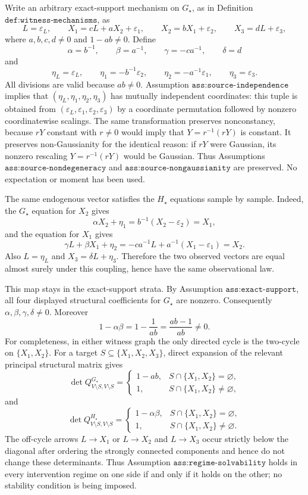 Write an arbitrary exact-support mechanism on \(G_\star\), as in Definition \(\texttt{def:witness-mechanisms}\), as
\[
 L=\varepsilon_L,\qquad
 X_1=cL+aX_2+\varepsilon_1,\qquad
 X_2=bX_1+\varepsilon_2,\qquad
 X_3=dL+\varepsilon_3,
\]
where \(a,b,c,d\ne0\) and \(1-ab\ne0\). Define
\[
 \alpha=b^{-1},\qquad \beta=a^{-1},\qquad
 \gamma=-ca^{-1},\qquad \delta=d
\]
and
\[
 \eta_L=\varepsilon_L,\qquad
 \eta_1=-b^{-1}\varepsilon_2,\qquad
 \eta_2=-a^{-1}\varepsilon_1,\qquad
 \eta_3=\varepsilon_3.
\]
All divisions are valid because \(ab\ne0\). Assumption \(\texttt{ass:source-independence}\) implies that \((\eta_L,\eta_1,\eta_2,\eta_3)\) has mutually independent coordinates: this tuple is obtained from \((\varepsilon_L,\varepsilon_1,\varepsilon_2,\varepsilon_3)\) by a coordinate permutation followed by nonzero coordinatewise scalings. The same transformation preserves nonconstancy, because \(rY\) constant with \(r\ne0\) would imply that \(Y=r^{-1}(rY)\) is constant. It preserves non-Gaussianity for the identical reason: if \(rY\) were Gaussian, its nonzero rescaling \(Y=r^{-1}(rY)\) would be Gaussian. Thus Assumptions \(\texttt{ass:source-nondegeneracy}\) and \(\texttt{ass:source-nongaussianity}\) are preserved. No expectation or moment has been used.

The same endogenous vector satisfies the \(H_\star\) equations sample by sample. Indeed, the \(G_\star\) equation for \(X_2\) gives
\[
 \alpha X_2+\eta_1
 =b^{-1}(X_2-\varepsilon_2)
 =X_1,
\]
and the equation for \(X_1\) gives
\[
 \gamma L+\beta X_1+\eta_2
 =-ca^{-1}L+a^{-1}(X_1-\varepsilon_1)
 =X_2.
\]
Also \(L=\eta_L\) and \(X_3=\delta L+\eta_3\). Therefore the two observed vectors are equal almost surely under this coupling, hence have the same observational law.

This map stays in the exact-support strata. By Assumption \(\texttt{ass:exact-support}\), all four displayed structural coefficients for \(G_\star\) are nonzero. Consequently \(\alpha,\beta,\gamma,\delta\ne0\). Moreover
\[
 1-\alpha\beta
 =1-\frac{1}{ab}
 =\frac{ab-1}{ab}\ne0.
\]
For completeness, in either witness graph the only directed cycle is the two-cycle on \(\{X_1,X_2\}\). For a target \(S\subseteq\{X_1,X_2,X_3\}\), direct expansion of the relevant principal structural matrix gives
\[
 \det Q^{G_\star}_{V\setminus S,V\setminus S}
 =\begin{cases}
 1-ab,&S\cap\{X_1,X_2\}=\varnothing,\\[2pt]
 1,&S\cap\{X_1,X_2\}\ne\varnothing,
 \end{cases}
\]
and
\[
 \det Q^{H_\star}_{V\setminus S,V\setminus S}
 =\begin{cases}
 1-\alpha\beta,&S\cap\{X_1,X_2\}=\varnothing,\\[2pt]
 1,&S\cap\{X_1,X_2\}\ne\varnothing.
 \end{cases}
\]
The off-cycle arrows \(L\to X_1\) or \(L\to X_2\) and \(L\to X_3\) occur strictly below the diagonal after ordering the strongly connected components and hence do not change these determinants. Thus Assumption \(\texttt{ass:regime-solvability}\) holds in every intervention regime on one side if and only if it holds on the other; no stability condition is being imposed.

